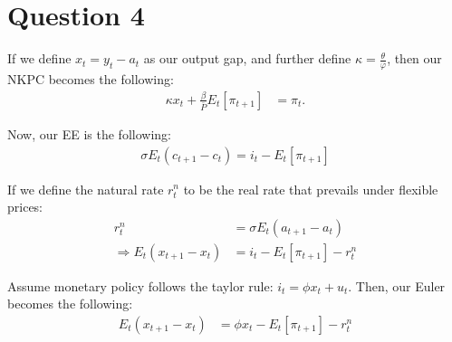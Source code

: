 \documentclass[11pt]{article} %
\begin{document}
\section{Question 4}

If we define $x_t = y_t - a_t$ as our output gap, and further define $\kappa =  \frac{\theta}{\varphi}$, then our NKPC becomes the following:
\begin{align*}
\kappa x_t + \frac{\beta}{\bar{P}}E_t[\pi_{t+1} ] &=\pi_t.
\end{align*}

Now, our EE is the following:
\begin{align*}
\sigma E_t(c_{t+1} - c_t) = i_t - E_t [\pi_{t+1}] 
\end{align*}

If we define the natural rate $r_t^n$ to be the real rate that prevails under flexible prices:
\begin{align*}
r_t^n &= \sigma  E_t(a_{t+1} - a_t)\\
\Rightarrow E_t(x_{t+1} - x_t) &= i_t - E_t [\pi_{t+1}] - r_t^n 
\end{align*}

Assume monetary policy follows the taylor rule: $i_t = \phi x_t + u_t$. Then, our Euler becomes the following:
\begin{align*}
E_t(x_{t+1} - x_t) &= \phi x_t - E_t [\pi_{t+1}] - r_t^n 
\end{align*}
\end{document}
